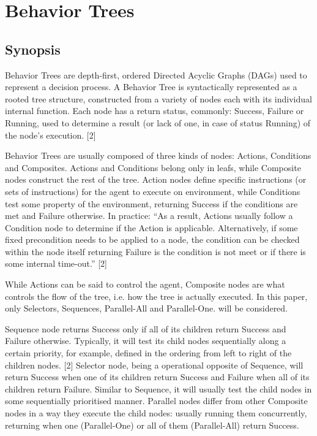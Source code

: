 \section{Behavior Trees}
\subsection{Synopsis}
Behavior Trees are depth-first, ordered Directed Acyclic Graphs (DAGs) used to represent a decision process. A Behavior Tree is syntactically represented as a rooted tree structure, constructed from a variety of nodes each with its individual internal function. Each node has a return status, commonly: Success, Failure or Running, used to determine a result (or lack of one, in case of status Running) of the node’s execution. [2]

Behavior Trees are usually composed of three kinds of nodes: Actions, Conditions and Composites. Actions and Conditions belong only in leafs, while Composite nodes construct the rest of the tree. Action nodes define specific instructions (or sets of instructions) for the agent to execute on environment, while Conditions test some property of the environment, returning Success if the conditions are met and Failure otherwise. In practice: ``As a result, Actions usually follow a Condition node to determine if the Action is applicable. Alternatively, if some fixed precondition needs to be applied to a node, the condition can be checked within the node itself returning Failure is the condition is not meet or if there is some internal time-out.'' [2]

While Actions can be said to control the agent, Composite nodes are what controls the flow of the tree, i.e. how the tree is actually executed. In this paper, only Selectors, Sequences, Parallel-All and Parallel-One. will be considered.

Sequence node returns Success only if all of its children return Success and Failure otherwise. Typically, it will test its child nodes sequentially along a certain priority, for example, defined in the ordering from left to right of the children nodes. [2]
Selector node, being a operational opposite of Sequence, will return Success when one of its children return Success and Failure when all of its children return Failure. Similar to Sequence, it will usually test the child nodes in some sequentially prioritised manner. Parallel nodes differ from other Composite nodes in a way they execute the child nodes: usually running them concurrently, returning when one (Parallel-One) or all of them (Parallel-All) return Success.

